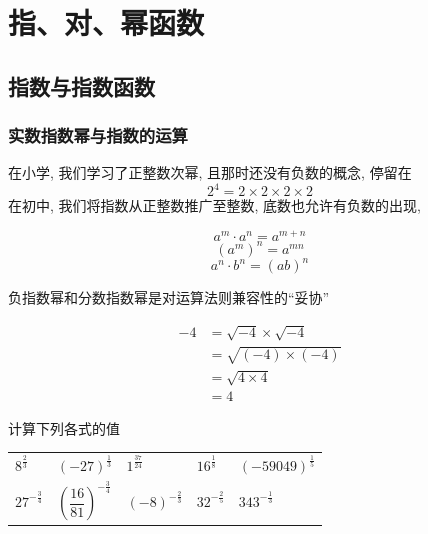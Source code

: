 \chapter{指、对、幂函数}
\section{指数与指数函数}

\subsection{实数指数幂与指数的运算}
在小学, 我们学习了正整数次幂, 且那时还没有负数的概念, 停留在
\[2^4=2\times2\times2\times2\]
在初中, 我们将指数从正整数推广至整数, 底数也允许有负数的出现, 

\begin{theorem}
    \begin{equation}
        a^m\cdot a^n=a^{m+n}
    \end{equation}
    \begin{equation}
        (a^m)^n=a^{mn}
    \end{equation}
    \begin{equation}
        a^n\cdot b^n=(ab)^n
    \end{equation}
\end{theorem}

负指数幂和分数指数幂是对运算法则兼容性的“妥协”
\begin{example}[Euler的谬误]
    \[\begin{aligned}
        -4&=\sqrt{-4}\times \sqrt{-4}\\
        &=\sqrt{(-4)\times(-4)}\\
        &=\sqrt{4\times 4}\\
        &=4
    \end{aligned}\]


\end{example}


\begin{exercise}计算下列各式的值
\begin{center}
      \begin{tabular}{lllll}
         \(8^{\frac{2}{3}}\)&$(-27)^{\frac{1}{3}}$&$1^{\frac{37}{24}}$&  \(16^{\frac{1}{8}}\)&\((-59049)^{\frac{1}{5}}\)\\
         \(27^{-\frac{3}{4}}\)&\((\dfrac{16}{81})^{-\frac{3}{4}}\)  &\((-8)^{-\frac{2}{3}}\) &\(32^{-\frac{2}{5}}\) &\(343^{-\frac{1}{3}}\)
        \end{tabular}
\end{center}
\end{exercise}

